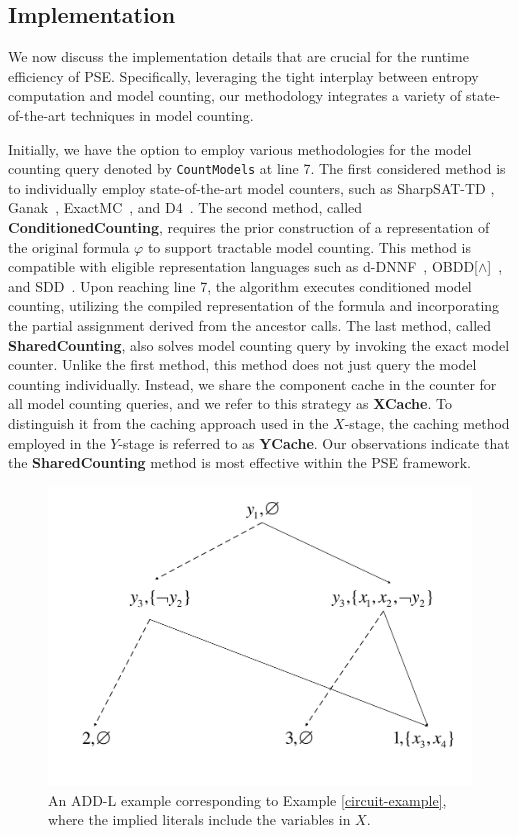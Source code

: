 \subsection{Implementation}

We now discuss the implementation details that are crucial for the runtime efficiency of PSE. 
Specifically, leveraging the tight interplay between entropy computation and model counting, our methodology integrates a variety of state-of-the-art techniques in model counting.

Initially, we have the option to employ various methodologies for the model counting query denoted by \texttt{CountModels} at line 7.
The first considered method is to individually employ state-of-the-art model counters, such as SharpSAT-TD \cite{korhonen2021integrating}, Ganak~\cite{sharma2019ganak}, ExactMC~\cite{lai2021power}, and D4~\cite{lagniez2017improved}.
The second method, called \textbf{ConditionedCounting}, requires the prior construction of a representation of the original formula $\varphi$ to support tractable model counting.
This method is compatible with eligible representation languages such as d-DNNF~\cite{darwiche2004new}, OBDD[$\land$]~\cite{lai2017new}, and SDD~\cite{choi2013compiling}.
Upon reaching line 7, the algorithm executes conditioned model counting, utilizing the compiled representation of the formula and incorporating the partial assignment derived from the ancestor calls.
The last method, called \textbf{SharedCounting}, also solves model counting query by invoking the exact model counter.
Unlike the first method, this method does not just query the model counting individually.
Instead, we share the component cache in the counter for all model counting queries, and we refer to this strategy as \textbf{XCache}.
To distinguish it from the caching approach used in the $X$-stage, the caching method employed in the $Y$-stage is referred to as \textbf{YCache}.
Our observations indicate that the \textbf{SharedCounting} method is most effective within the PSE framework.

\begin{figure}[!htbp]
	
	\centering
	\includegraphics[width=0.7\linewidth]{figures/ADD-L-example2.pdf}
	\caption{An ADD-L example corresponding to Example \ref{circuit-example}, where the implied literals include the variables in $X$. }
	\label{fig:ADDL-example2}
\end{figure} 

